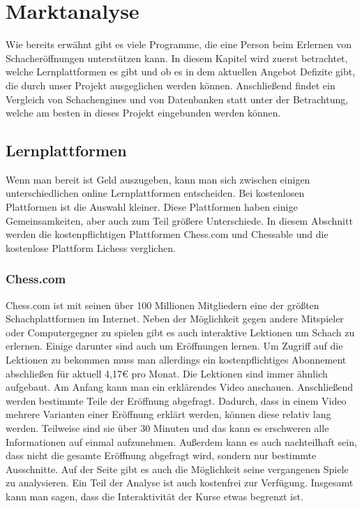 
\chapter{Marktanalyse}
Wie bereits erwähnt gibt es viele Programme, die eine Person beim Erlernen von Schacheröffnungen unterstützen kann. In diesem Kapitel wird zuerst betrachtet, welche Lernplattformen es gibt und ob es in dem aktuellen Angebot Defizite gibt, die durch unser Projekt ausgeglichen werden können. Anschließend findet ein Vergleich von Schachengines und von Datenbanken statt unter der Betrachtung, welche am besten in dieses Projekt eingebunden werden können.


\section{Lernplattformen}
Wenn man bereit ist Geld auszugeben, kann man sich zwischen einigen unterschiedlichen online Lernplattformen entscheiden. Bei kostenlosen Plattformen ist die Auswahl kleiner. Diese Plattformen haben einige Gemeinsamkeiten, aber auch zum Teil größere Unterschiede. In diesem Abschnitt werden die kostenpflichtigen Plattformen Chess.com und Chessable und die kostenlose Plattform Lichess verglichen.

\subsection{Chess.com}
Chess.com ist mit seinen über 100 Millionen Mitgliedern eine der größten Schachplattformen im Internet. \cite{chesscom_chesscom_2022} Neben der Möglichkeit gegen andere Mitspieler oder Computergegner zu spielen gibt es auch interaktive Lektionen um Schach zu erlernen. Einige darunter sind auch um Eröffnungen lernen. Um Zugriff auf die Lektionen zu bekommen muss man allerdings ein kostenpflichtiges Abonnement abschließen für aktuell 4,17€ pro Monat. Die Lektionen sind immer ähnlich aufgebaut. Am Anfang kann man ein erklärendes Video anschauen. Anschließend werden bestimmte Teile der Eröffnung abgefragt. Dadurch, dass in einem Video mehrere Varianten einer Eröffnung erklärt werden, können diese relativ lang werden. Teilweise sind sie über 30 Minuten und das kann es erschweren alle Informationen auf einmal aufzunehmen. Außerdem kann es auch nachteilhaft sein, dass nicht die gesamte Eröffnung abgefragt wird, sondern nur bestimmte Ausschnitte. Auf der Seite gibt es auch die Möglichkeit seine vergangenen Spiele zu analysieren. Ein Teil der Analyse ist auch kostenfrei zur Verfügung. Insgesamt kann man sagen, dass die Interaktivität der Kurse etwas begrenzt ist.

